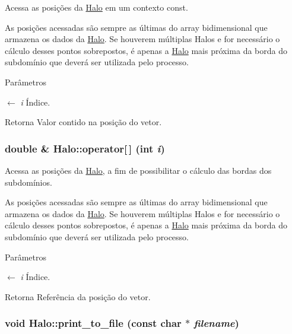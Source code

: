 Acessa as posições da \hyperlink{classHalo}{Halo} em um contexto const. 

As posições acessadas são sempre as últimas do array bidimensional que armazena os dados da \hyperlink{classHalo}{Halo}. Se houverem múltiplas Halos e for necessário o cálculo desses pontos sobrepostos, é apenas a \hyperlink{classHalo}{Halo} mais próxima da borda do subdomínio que deverá ser utilizada pelo processo.


\begin{DoxyParams}{Parâmetros}
\item[\mbox{$\leftarrow$} {\em i}]Índice. \end{DoxyParams}
\begin{DoxyReturn}{Retorna}
Valor contido na posição do vetor. 
\end{DoxyReturn}
\hypertarget{classHalo_a24173356d80c075ce91c0efa4ec2796c}{
\subsubsection[{operator[]}]{\setlength{\rightskip}{0pt plus 5cm}double \& Halo::operator\mbox{[}$\,$\mbox{]} (int {\em i})}}
\label{classHalo_a24173356d80c075ce91c0efa4ec2796c}


Acessa as posições da \hyperlink{classHalo}{Halo}, a fim de possibilitar o cálculo das bordas dos subdomínios. 

As posições acessadas são sempre as últimas do array bidimensional que armazena os dados da \hyperlink{classHalo}{Halo}. Se houverem múltiplas Halos e for necessário o cálculo desses pontos sobrepostos, é apenas a \hyperlink{classHalo}{Halo} mais próxima da borda do subdomínio que deverá ser utilizada pelo processo.


\begin{DoxyParams}{Parâmetros}
\item[\mbox{$\leftarrow$} {\em i}]Índice. \end{DoxyParams}
\begin{DoxyReturn}{Retorna}
Referência da posição do vetor. 
\end{DoxyReturn}
\hypertarget{classHalo_a3db72b220e013aeb89be9b295f3def39}{
\subsubsection[{print\_\-to\_\-file}]{\setlength{\rightskip}{0pt plus 5cm}void Halo::print\_\-to\_\-file (const char $\ast$ {\em filename})}}
\label{classHalo_a3db72b220e013aeb89be9b295f3def39}


